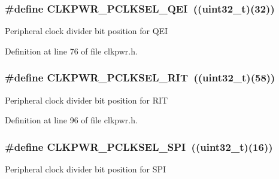 \subsubsection[{\texorpdfstring{C\+L\+K\+P\+W\+R\+\_\+\+P\+C\+L\+K\+S\+E\+L\+\_\+\+Q\+EI}{CLKPWR_PCLKSEL_QEI}}]{\setlength{\rightskip}{0pt plus 5cm}\#define C\+L\+K\+P\+W\+R\+\_\+\+P\+C\+L\+K\+S\+E\+L\+\_\+\+Q\+EI~(({\bf uint32\+\_\+t})(32))}\hypertarget{group___c_l_k_p_w_r___public___macros_gacdf0446e521b6cdec979ffece2ba73f5}{}\label{group___c_l_k_p_w_r___public___macros_gacdf0446e521b6cdec979ffece2ba73f5}
Peripheral clock divider bit position for Q\+EI 

Definition at line 76 of file clkpwr.\+h.

\subsubsection[{\texorpdfstring{C\+L\+K\+P\+W\+R\+\_\+\+P\+C\+L\+K\+S\+E\+L\+\_\+\+R\+IT}{CLKPWR_PCLKSEL_RIT}}]{\setlength{\rightskip}{0pt plus 5cm}\#define C\+L\+K\+P\+W\+R\+\_\+\+P\+C\+L\+K\+S\+E\+L\+\_\+\+R\+IT~(({\bf uint32\+\_\+t})(58))}\hypertarget{group___c_l_k_p_w_r___public___macros_ga7017b827f2ec5d3b822371ab3eb43bd9}{}\label{group___c_l_k_p_w_r___public___macros_ga7017b827f2ec5d3b822371ab3eb43bd9}
Peripheral clock divider bit position for R\+IT 

Definition at line 96 of file clkpwr.\+h.

\subsubsection[{\texorpdfstring{C\+L\+K\+P\+W\+R\+\_\+\+P\+C\+L\+K\+S\+E\+L\+\_\+\+S\+PI}{CLKPWR_PCLKSEL_SPI}}]{\setlength{\rightskip}{0pt plus 5cm}\#define C\+L\+K\+P\+W\+R\+\_\+\+P\+C\+L\+K\+S\+E\+L\+\_\+\+S\+PI~(({\bf uint32\+\_\+t})(16))}\hypertarget{group___c_l_k_p_w_r___public___macros_gab9cf1de13d64711004e44ed10356c9a6}{}\label{group___c_l_k_p_w_r___public___macros_gab9cf1de13d64711004e44ed10356c9a6}
Peripheral clock divider bit position for S\+PI 

